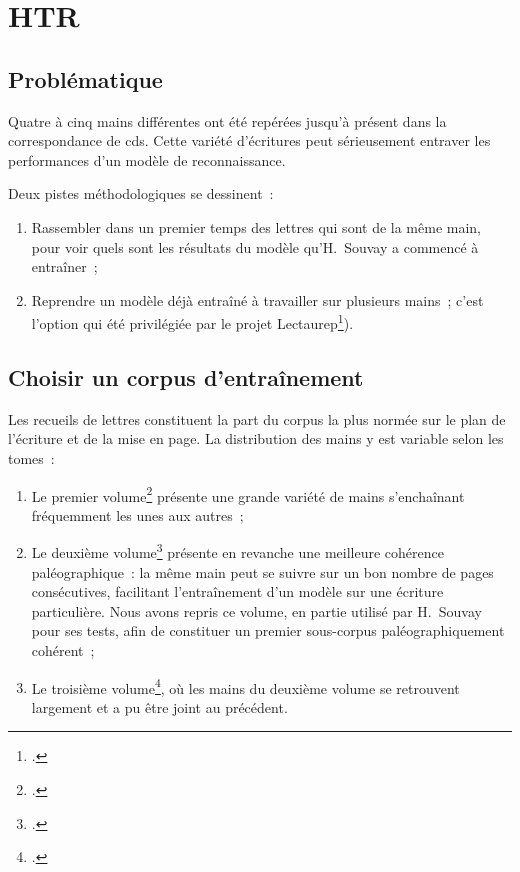 \documentclass[a4paper,12pt,twoside]{book}
\begin{document}
	
	\tableofcontents
	
	\chapter{HTR}
		
		\section{Problématique}
		Quatre à cinq mains différentes ont été repérées jusqu'à présent dans la correspondance de \gls{cds}. Cette variété d'écritures peut sérieusement entraver les performances d'un modèle de reconnaissance.
		
		Deux pistes méthodologiques se dessinent~:
		\begin{enumerate}
			\item Rassembler dans un premier temps des lettres qui sont de la même main, pour voir quels sont les résultats du modèle qu'H. Souvay a commencé à entraîner ;
			\item Reprendre un modèle déjà entraîné à travailler sur plusieurs mains~; c'est l'option qui été privilégiée par le projet Lectaurep\footcite{chagueCreationModelesTranscriptiona}).
		\end{enumerate}
				
		\section{Choisir un corpus d'entraînement}
		Les recueils de lettres constituent la part du corpus la plus normée sur le plan de l'écriture et de la mise en page. La distribution des mains y est variable selon les tomes :
		\begin{enumerate}
			\item Le premier volume\footcite{salmCorrespondanceGeneraleSecondea} présente une grande variété de mains s'enchaînant fréquemment les unes aux autres~;
			\item Le deuxième volume\footcite{salmCorrespondanceGeneraleSeconde}  présente en revanche une meilleure cohérence paléographique : la même main peut se suivre sur un bon nombre de pages consécutives, facilitant l'entraînement d'un modèle sur une écriture particulière. Nous avons repris ce volume, en partie utilisé par H. Souvay pour ses tests, afin de constituer un premier sous-corpus paléographiquement cohérent~;
			\item Le troisième volume\footcite{salmCorrespondanceGeneraleSecondeb}, où les mains du deuxième volume se retrouvent largement et a pu être joint au précédent.
		\end{enumerate}
	
\end{document}
